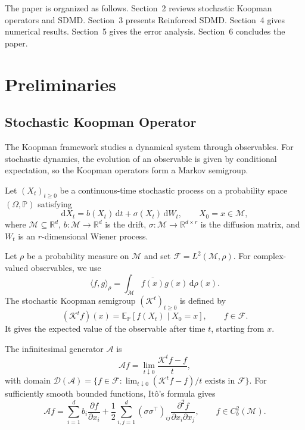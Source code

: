 \documentclass{article}
\numberwithin{equation}{section}
\theoremstyle{definition}
\begin{document}
The paper is organized as follows. Section~2 reviews stochastic Koopman operators and SDMD. Section~3 presents Reinforced SDMD. Section~4 gives numerical results. Section~5 gives the error analysis. Section~6 concludes the paper.

\section{Preliminaries}
\subsection{Stochastic Koopman Operator}
The Koopman framework studies a dynamical system through observables. For stochastic dynamics, the evolution of an observable is given by conditional expectation, so the Koopman operators form a Markov semigroup.

Let $(X_t)_{t\ge0}$ be a continuous-time stochastic process on a probability space $(\Omega,\mathbb{P})$ satisfying
\begin{equation*}
    \mathrm{d}X_t=b(X_t)\,\mathrm{d}t+\sigma(X_t)\,\mathrm{d}W_t,
    \qquad X_0=x\in\mathcal{M},
\end{equation*}
where $\mathcal{M}\subseteq\mathbb{R}^d$, $b:\mathcal{M}\to\mathbb{R}^d$ is the drift, $\sigma:\mathcal{M}\to\mathbb{R}^{d\times r}$ is the diffusion matrix, and $W_t$ is an $r$-dimensional Wiener process.

Let $\rho$ be a probability measure on $\mathcal{M}$ and set $\mathcal{F}=L^2(\mathcal{M},\rho)$. For complex-valued observables, we use
\[
    \langle f,g\rangle_\rho=\int_{\mathcal{M}}\overline{f(x)}g(x)\,\mathrm{d}\rho(x).
\]
The stochastic Koopman semigroup $(\mathcal{K}^t)_{t\ge0}$ is defined by
\begin{equation*}
    (\mathcal{K}^t f)(x)=\mathbb{E}_{\mathbb{P}}[f(X_t)\mid X_0=x],
    \qquad f\in\mathcal{F}.
\end{equation*}
It gives the expected value of the observable after time $t$, starting from $x$.

The infinitesimal generator $\mathcal{A}$ is
\begin{equation*}
\mathcal{A}f=\lim_{t\downarrow0}\frac{\mathcal{K}^t f-f}{t},
\end{equation*}
with domain $\mathcal{D}(\mathcal{A})=\{f\in\mathcal{F}:\lim_{t\downarrow0}(\mathcal{K}^t f-f)/t\text{ exists in }\mathcal{F}\}$. For sufficiently smooth bounded functions, It\^{o}'s formula gives~\cite{pavliotis2016stochastic}
\begin{equation*}
    \mathcal{A}f
    =\sum_{i=1}^d b_i\frac{\partial f}{\partial x_i}
    +\frac12\sum_{i,j=1}^d(\sigma\sigma^\top)_{ij}
    \frac{\partial^2 f}{\partial x_i\partial x_j},
    \qquad f\in C_b^2(\mathcal{M}).
\end{equation*}
\end{document}
